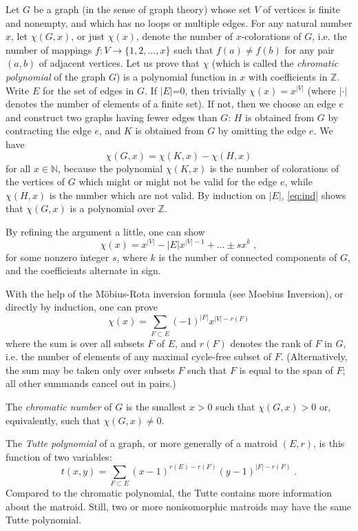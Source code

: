 \documentclass[12pt]{article}
\newcommand{\N}{\mathbb{N}}
\newcommand{\Z}{\mathbb{Z}}
\begin{document}
Let $G$ be a graph (in the sense of graph theory) whose set $V$
of vertices is finite and nonempty, and which has no loops or
multiple edges.
For any natural number $x$, let $\chi(G,x)$, or just $\chi(x)$,
denote the number of $x$-colorations of $G$, i.e. the number of
mappings $f\colon V\to\{1,2,\ldots,x\}$ such that $f(a)\ne f(b)$ for any
pair $(a,b)$ of adjacent vertices.
Let us prove that $\chi$ (which is called the
\emph{chromatic polynomial} of the graph $G$)
is a polynomial function in $x$ with coefficients in $\Z$.
Write $E$ for the set of edges in $G$. If $|E|$=0, then trivially
$\chi(x)=x^{|V|}$ (where $|\cdot|$ denotes the number of elements
of a finite set).
If not, then we choose an edge $e$ and construct two graphs
having fewer edges than $G$: $H$ is obtained from $G$ by contracting
the edge $e$, and $K$ is obtained from $G$ by omitting the edge $e$.
We have
\begin{equation} \label{eq:ind}
\chi(G,x)=\chi(K,x)-\chi(H,x)
\end{equation}
for all $x\in\N$, because the polynomial $\chi(K,x)$ is the number
of colorations of the vertices of $G$ which might or might not be
valid for the edge $e$, while $\chi(H,x)$ is the number which
are not valid.
By induction on $|E|$, \eqref{eq:ind} shows that $\chi(G,x)$ is
a polynomial over $\Z$.

By refining the argument a little, one can show
$$\chi(x)=x^{|V|}-|E|x^{|V|-1}+\ldots\pm sx^k\;,$$
for some nonzero integer $s$, where $k$ is the number
of connected components of $G$, and the coefficients alternate in sign.

With the help of the M\"obius-Rota
inversion formula (see Moebius Inversion),
or directly by induction, one can prove
$$\chi(x)=\sum_{F\subset E}(-1)^{|F|}x^{|V|-r(F)}$$
where the sum is over all subsets $F$ of $E$, and $r(F)$ denotes the
rank of $F$ in $G$, i.e. the number of elements of
any maximal cycle-free subset of $F$.
(Alternatively, the sum may be taken only over subsets $F$ such that
$F$ is equal to the span of $F$; all other summands cancel
out in pairs.)

The \emph{chromatic number} of $G$ is the smallest $x>0$ such that
$\chi(G,x)>0$ or, equivalently, such that $\chi(G,x)\ne0$.

The \emph{Tutte polynomial} of a graph, or more generally of a matroid
$(E,r)$, is this function of two variables:
$$t(x,y)=\sum_{F\subset E}(x-1)^{r(E)-r(F)}(y-1)^{|F|-r(F)}\;.$$
Compared to the chromatic polynomial, the Tutte contains more information
about the matroid.
Still, two or more nonisomorphic matroids may have the same Tutte polynomial.
\end{document}
